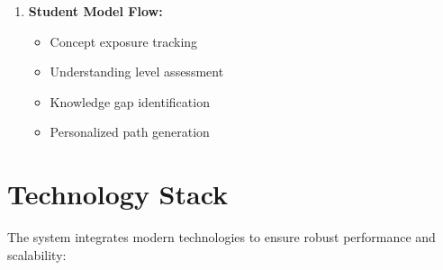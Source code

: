 \begin{enumerate}
    \item \textbf{Student Model Flow:}
        \begin{itemize}
            \item Concept exposure tracking
            \item Understanding level assessment
            \item Knowledge gap identification
            \item Personalized path generation
        \end{itemize}
\end{enumerate}

\section{Technology Stack}
\label{sec:tech-stack}

The system integrates modern technologies to ensure robust performance and scalability:

